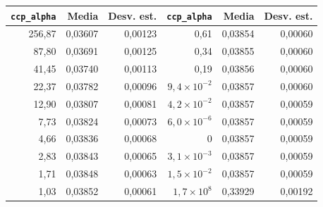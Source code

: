 \begin{tabular}{rrr@{\hspace{1cm}}rrr}
\toprule
\texttt{ccp\_alpha} & Media & Desv. est. & \texttt{ccp\_alpha} & Media & Desv. est. \\
\midrule
256{,}87 & 0{,}03607 & 0{,}00123 & 0{,}61 & 0{,}03854 & 0{,}00060 \\
87{,}80 & 0{,}03691 & 0{,}00125 & 0{,}34 & 0{,}03855 & 0{,}00060 \\
41{,}45 & 0{,}03740 & 0{,}00113 & 0{,}19 & 0{,}03856 & 0{,}00060 \\
22{,}37 & 0{,}03782 & 0{,}00096 & $9{,}4\times10^{-2}$ & 0{,}03857 & 0{,}00060 \\
12{,}90 & 0{,}03807 & 0{,}00081 & $4{,}2\times10^{-2}$ & 0{,}03857 & 0{,}00059 \\
7{,}73 & 0{,}03824 & 0{,}00073 & $6{,}0\times10^{-6}$ & 0{,}03857 & 0{,}00059 \\
4{,}66 & 0{,}03836 & 0{,}00068 & 0 & 0{,}03857 & 0{,}00059 \\
2{,}83 & 0{,}03843 & 0{,}00065 & $3{,}1\times10^{-3}$ & 0{,}03857 & 0{,}00059 \\
1{,}71 & 0{,}03848 & 0{,}00063 & $1{,}5\times10^{-2}$ & 0{,}03857 & 0{,}00059 \\
1{,}03 & 0{,}03852 & 0{,}00061 & $1{,}7\times10^{8}$ & 0{,}33929 & 0{,}00192 \\
\bottomrule
\end{tabular}